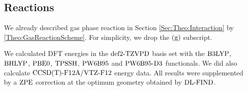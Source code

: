 \documentclass[8.5pt,twoside,twocolumn]{article}
\newcommand\zpe{\enmat{\te{ZPE}}}
\newcommand\dlfind{\enmat{\te{DL-FIND}}}
\theoremstyle{standard}
\begin{document}
\subsection{Reactions}
\label{Sec:Gas:Reaction}
We already described gas phase reaction in Section \ref{Sec:Theo:Interaction} by 
\eqref{Theo:GasReactionScheme}. For simplicity, we drop the $(\text g)$ subscript.

We calculated DFT energies in the $\text{def2-TZVPD}$ basis set with
the $\text{B3LYP}$, $\text{BHLYP}$, $\text{PBE0}$, $\text{TPSSH}$, $\text{PW6B95}$ and $\text{PW6B95}\text{-D3}$
functionals. We did also calculate $\text{CCSD(T)-F12A}/\text{VTZ-F}12$ energy data.
All results were supplemented by a $\zpe$ correction at the
optimum geometry obtained by $\dlfind$. 

\end{document}
